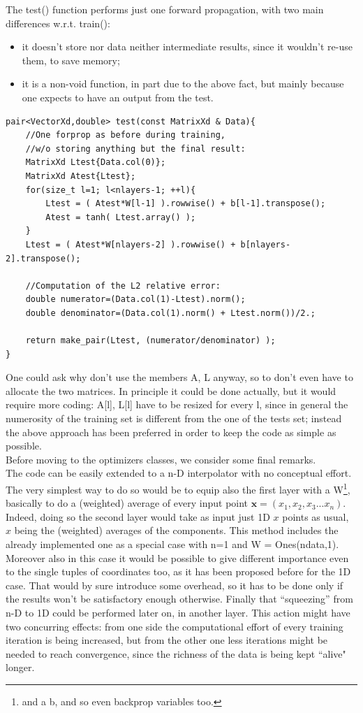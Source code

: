\documentclass[12pt, a4paper]{report}
\theoremstyle{definition}
\begin{document}
\newline \noindent The {\ttfamily test()} function performs just one forward propagation, with two main differences w.r.t. {\ttfamily train()}:
\begin{itemize}
	\item it doesn't store nor data neither intermediate results, since it wouldn't re-use them, to save memory;
	\item it is a non-void function, in part due to the above fact, but mainly because one expects to have an output from the test.
\end{itemize}
\begin{lstlisting}[frame=single]
pair<VectorXd,double> test(const MatrixXd & Data){
	//One forprop as before during training,
	//w/o storing anything but the final result:
	MatrixXd Ltest{Data.col(0)};
	MatrixXd Atest{Ltest};
	for(size_t l=1; l<nlayers-1; ++l){
		Ltest = ( Atest*W[l-1] ).rowwise() + b[l-1].transpose();
		Atest = tanh( Ltest.array() );	
	}
	Ltest = ( Atest*W[nlayers-2] ).rowwise() + b[nlayers-2].transpose();
	
	//Computation of the L2 relative error:
	double numerator=(Data.col(1)-Ltest).norm();
	double denominator=(Data.col(1).norm() + Ltest.norm())/2.;
	
	return make_pair(Ltest, (numerator/denominator) );
}
\end{lstlisting}
One could ask why don't use the members {\ttfamily A, L} anyway, so to don't even have to allocate the two matrices. In principle it could be done actually, but it would require more coding: {\ttfamily A[l], L[l]} have to be resized for every {\ttfamily l}, since in general the numerosity of the training set is different from the one of the tests set; instead the above approach has been preferred in order to keep the code as simple as possible.\\
\newline\noindent Before moving to the optimizers classes, we consider some final remarks.\\
The code can be easily extended to a n-D interpolator with no conceptual effort. The very simplest way to do so would be to equip also the first layer with a {\ttfamily W}\footnote{and a {\ttfamily b}, and so even backprop variables too.}, basically to do a (weighted) average of every input point $\bm x = (x_1,x_2,x_3...x_n)$. Indeed, doing so the second layer would take as input just 1D $x$ points as usual, $x$ being the (weighted) averages of the components. This method includes the already implemented one as a special case with n=1 and {\ttfamily W = Ones(ndata,1)}. Moreover also in this case it would be possible to give different importance even to the single tuples of coordinates too, as it has been proposed before for the 1D case. That would by sure introduce some overhead, so it has to be done only if the results won't be satisfactory enough otherwise. Finally that ``squeezing'' from n-D to 1D could be performed later on, in another layer. This action might have two concurring effects: from one side the computational effort of every training iteration is being increased, but from the other one less iterations might be needed to reach convergence, since the richness of the data is being kept ``alive" longer. \\
\end{document}
